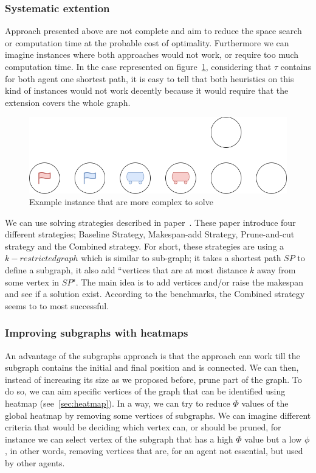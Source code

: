 \subsubsection{Systematic extention}

Approach presented above are not complete and aim to reduce the space search or computation time at the probable cost of optimality. Furthermore we can imagine instances where both approaches would not work, or require too much computation time. In the case represented on figure~\ref{img:systemetic_instance}, considering that \(\tau\) contains for both agent one shortest path, it is easy to tell that both heuristics on this kind of instances would not work decently because it would require that the extension covers the whole graph.

\begin{figure}[H]
  \centering
  \caption{Example instance that are more complex to solve}\label{img:systemetic_instance}
  \includegraphics[width=\widthimg]{img/systematic_instance.drawio.png}
\end{figure}

We can use solving strategies described in paper~\cite{husvobbass22a,husvobbass22b}. These paper introduce four different strategies; Baseline Strategy,  Makespan-add Strategy, Prune-and-cut strategy and the Combined strategy. For short, these strategies are using a \(k-restricted graph\) which is similar to sub-graph; it takes a shortest path \(SP\) to define a subgraph, it also add ``vertices that are at most distance \(k\) away from some vertex in \(SP\)". The main idea is to add vertices and/or raise the makespan and see if a solution exist. According to the benchmarks, the Combined strategy seems to to most successful.

\subsubsection{Improving subgraphs with heatmaps}

An advantage of the subgraphs approach is that the approach can work till the subgraph contains the initial and final position and is connected. We can then, instead of increasing its size as we proposed before, prune part of the graph. To do so, we can aim specific vertices of the graph that can be identified using heatmap (see~\ref{sec:heatmap}). In a way, we can try to reduce \(\Phi\) values of the global heatmap by removing some vertices of subgraphs. We can imagine different criteria that would be deciding which vertex can, or should be pruned, for instance we can select vertex of the subgraph that has a high \(\Phi\) value but a low \(\phi\), in other words, removing vertices that are, for an agent not essential, but used by other agents.

